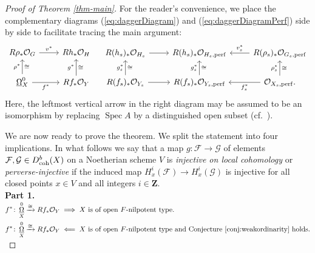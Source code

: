 \documentclass[letterpaper,11pt]{amsart}
\DeclareMathOperator{\DDB}{\underline{\Omega}}
\theoremstyle{plain}
\theoremstyle{definition}
\theoremstyle{remark}
\def\Z{{\mathbf Z}}
\def\cF{\mathcal{F}}
\def\cG{\mathcal{G}}
\def\cO{\mathcal{O}}
\DeclareMathOperator{\Spec} {Spec}
\begin{document}
\begin{proof}[Proof of Theorem \ref{thm-main}]
For the reader’s convenience, we place the complementary diagrams (\ref{eq:daggerDiagram}) and (\ref{eq:daggerDiagramPerf}) side by side to facilitate tracing the main argument:
\begin{equation} \label{eq:daggerDiagramFull}
\begin{tikzcd}
\ar{r}{v^*} R\rho_*\cO_G  & Rh_*\cO_H  \\
\ar{r}[swap]{f^*} \DDB^0_X  \ar{u}{\rho^*}[swap]{\cong} &  Rf_* \cO_Y \ar{u}{g^*}[swap]{\cong} 
\end{tikzcd}
\hspace{1em}
\begin{tikzcd}
R(h_s)_*\cO_{H_s} \ar{r} & R(h_s)_*\cO_{H_s, {\rm perf}} & \ar{l}[swap]{v_s^*} R(\rho_s)_*\cO_{G_s, {\rm perf}} \\
R(f_s)_* \cO_{Y_s} \ar{u}{g_s^*}[swap]{\cong} \ar{r} & R(f_s)_* \cO_{Y_s, {\rm perf}} \ar{u}{g_s^*}[swap]{\cong} & \ar{l}{f_s^*} \cO_{X_s, {\rm perf}}.  \ar{u}{\rho_s^*}[swap]{\cong}
\end{tikzcd}
\end{equation}
Here, the leftmost vertical arrow in the right diagram may be assumed to be an isomorphism by replacing $\Spec A$ by a distinguished open subset (cf.\ \cite[Lemma 2.3]{kawakami2026higherfrationalsingularities}).

We are now ready to prove the theorem. We split the statement into four implications. In what follows we say that a map $g \colon \cF \to \cG$ of elements $\cF, \cG \in D^b_{\rm coh}(X)$ on a Noetherian scheme $V$ is \emph{injective on local cohomology} or \emph{perverse-injective} if the induced map $H^i_x(\cF) \to H^i_x(\cG)$ is injective for all closed points $x \in V$ and all integers $i \in \Z$. \\


\noindent \textbf{Part 1.} $\begin{aligned}[t] f^* \colon \DDB^0_X \xrightarrow{\cong} Rf_*\cO_Y  &\implies \text{$X$ is of open $F$-nilpotent type.} \\ f^* \colon \DDB^0_X \xrightarrow{\cong} Rf_*\cO_Y &\impliedby  \text{$X$ is of open $F$-nilpotent type and Conjecture  \ref{conj:weakordinarity} holds.} \end{aligned}$\\[0.3em]


\end{proof}
\end{document}
